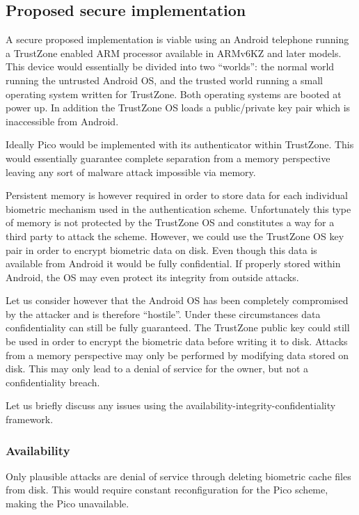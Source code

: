 \subsection{Proposed secure implementation}

A secure proposed implementation is viable using an Android telephone running a TrustZone enabled ARM processor available in ARMv6KZ \cite{} and later models. This device would essentially be divided into two ``worlds'': the normal world running the untrusted Android OS, and the trusted world running a small operating system written for TrustZone. Both operating systems are booted at power up. In addition the TrustZone OS loads a public/private key pair which is inaccessible from Android.  

Ideally Pico would be implemented with its authenticator within TrustZone. This would essentially guarantee complete separation from a memory perspective leaving any sort of malware attack impossible via memory. 

Persistent memory is however required in order to store data for each individual biometric mechanism used in the authentication scheme. Unfortunately this type of memory is not protected by the TrustZone OS and constitutes a way for a third party to attack the scheme. However, we could use the TrustZone OS key pair in order to encrypt biometric data on disk. Even though this data is available from Android it would be fully confidential. If properly stored within Android, the OS may even protect its integrity from outside attacks.

Let us consider however that the Android OS has been completely compromised by the attacker and is therefore ``hostile''. Under these circumstances data confidentiality can still be fully guaranteed. The TrustZone public key could still be used in order to encrypt the biometric data before writing it to disk. Attacks from a memory perspective may only be performed by modifying data stored on disk. This may only lead to a denial of service for the owner, but not a confidentiality breach.

Let us briefly discuss any issues using the availability-integrity-confidentiality framework.
	\subsubsection*{Availability}
	Only plausible attacks are denial of service through deleting biometric cache files from disk. This would require constant reconfiguration for the Pico scheme, making the Pico unavailable.
	
